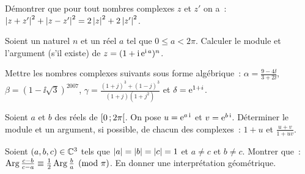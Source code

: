                                 \begin{exercice}
                                  Démontrer que pour tout nombres complexes \(z\) et \(z'\) on a~:\(\left\lvert z + 
                                  z'\right\rvert^2 + \left\lvert z-z'\right\rvert^2 = 2\left\lvert z\right\rvert^2 + 2\left\lvert z'\right\rvert^2\).
                                \end{exercice}

                                \begin{exercice}
                                  Soient un naturel \(n\) et un réel \(a\) tel que \(0 \leqslant a < 2\pi\).  
                                  Calculer le module et l'argument (s'il existe) de \(z = (1 + \operatorname{i}\operatorname{e}^{\operatorname{i} 
                                  a})^n\).
                                \end{exercice}

                                \begin{exercice}
                                  Mettre les nombres complexes suivants sous forme algébrique~: \(\alpha = 
                                  \frac{9-4\ii}{3 + 2\ii}\), \(\beta = (1-\ii\sqrt{3})^{2007}\), \(\gamma = 
                                  \frac{(1 + j)^3 + (1-j)^3}{(1 + j)(1 + j^2)}\) et \( \delta = \operatorname{e}^{1 + i}\).
                                \end{exercice}

                                \begin{exercice}
                                  Soient \(a\) et \(b\) des réels de \(\left[ 0 \, ;  2\pi \right[\). On pose \(u = 
                                  \operatorname{e}^{a\operatorname{i}}\) et \(v = \operatorname{e}^{b\operatorname{i}}\). Déterminer le module et un argument, si 
                                  possible, de chacun des complexes~: \(1 + u\) et \(\frac{u + v}{1 + uv}\).
                                \end{exercice}

                                \begin{exercice}
                                  Soient \((a, b, c) \in \mathbb{C}^3\) tels que \(\left\lvert a\right\rvert = \left\lvert b\right\rvert = \left\lvert c\right\rvert = 1\) 
                                  et \(a \neq c\) et \(b \neq c\). Montrer que~:\(\operatorname{Arg} \frac{c-b}{c-a} \equiv 
                                  \frac{1}{2} \operatorname{Arg} \frac{b}{a} \pmod \pi\). En donner une interprétation 
                                  géométrique.
                                \end{exercice}

